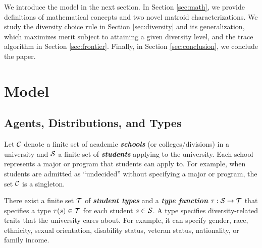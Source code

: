 \documentclass[12pt]{amsart}
\theoremstyle{remark}
\newcommand{\df}[1]{\textbf{\textit{#1}}}
\newcommand{\mby}[1]{{\color{blue} MBY: #1 }}
\begin{document}
We introduce the model in the next section. In Section \ref{sec:math}, we provide
definitions of mathematical concepts and two novel matroid
characterizations. We study the diversity choice rule in Section
\ref{sec:diversity} and its generalization, which maximizes merit
subject to attaining a given diversity level, and the trace algorithm in Section \ref{sec:frontier}.
Finally, in Section \ref{sec:conclusion}, we conclude the paper.



\section{Model}\label{sec:model}

\subsection{Agents, Distributions, and Types}
Let $\mathcal{C}$ denote a finite set of academic \df{schools} (or colleges/divisions) in a university and $\mathcal{S}$
a finite set of \df{students} applying to the university. Each school represents a
major or program that students can apply to. For example, when students are admitted
as ``undecided'' without specifying a major or program, the set $\mathcal{C}$ is a singleton.

There exist a finite set $\mathcal{T}$ of \df{student types} and a \df{type function}
$\tau : \mathcal{S} \rightarrow \mathcal{T}$
that specifies a type $\tau(s)\in \mathcal{T}$ for each student $s\in \mathcal{S}$.
A type specifies diversity-related traits that the university cares about. For example,
it can specify gender, race, ethnicity, sexual orientation, disability status, veteran
status, nationality, or family income.

\end{document}
